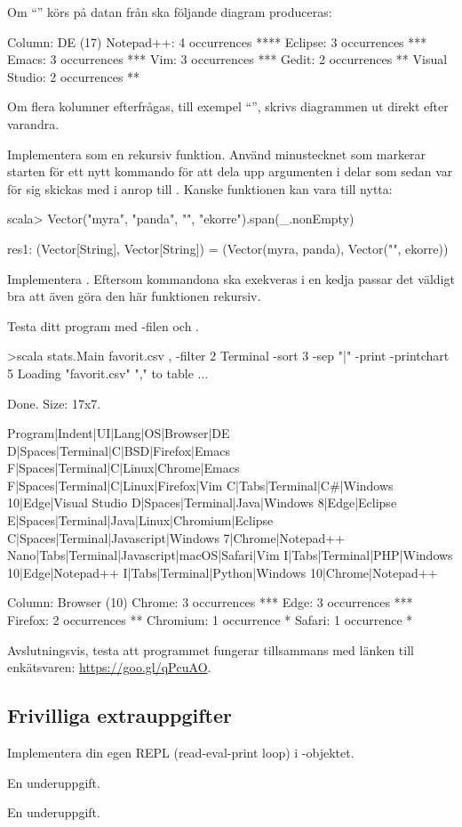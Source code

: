 Om ``'' körs på datan från  ska följande diagram produceras:
\begin{REPLnonum}
Column: DE (17)
Notepad++: 4 occurrences
****
Eclipse: 3 occurrences
***
Emacs: 3 occurrences
***
Vim: 3 occurrences
***
Gedit: 2 occurrences
**
Visual Studio: 2 occurrences
**

\end{REPLnonum}
Om flera kolumner efterfrågas, till exempel ``'', skrivs diagrammen ut direkt efter varandra.

\Subtask Implementera  som en rekursiv funktion. Använd minustecknet som markerar starten för ett nytt kommando för att dela upp argumenten  i delar som sedan var för sig skickas med i anrop till . Kanske funktionen  kan vara till nytta:
\begin{REPLnonum}
scala> Vector("myra", "panda", "", "ekorre").span(_.nonEmpty)

res1: (Vector[String], Vector[String]) = (Vector(myra, panda),
                                         Vector("", ekorre))
\end{REPLnonum}

\Subtask Implementera . Eftersom kommandona ska exekveras i en kedja passar det väldigt bra att även göra den här funktionen rekursiv.

\Subtask Testa ditt program med -filen och .
\begin{REPLnonum}
>scala stats.Main favorit.csv , -filter 2 Terminal -sort 3 -sep "|" -print
-printchart 5
Loading "favorit.csv" "," to table ...

Done. Size: 17x7.

Program|Indent|UI|Lang|OS|Browser|DE
D|Spaces|Terminal|C|BSD|Firefox|Emacs
F|Spaces|Terminal|C|Linux|Chrome|Emacs
F|Spaces|Terminal|C|Linux|Firefox|Vim
C|Tabs|Terminal|C#|Windows 10|Edge|Visual Studio
D|Spaces|Terminal|Java|Windows 8|Edge|Eclipse
E|Spaces|Terminal|Java|Linux|Chromium|Eclipse
C|Spaces|Terminal|Javascript|Windows 7|Chrome|Notepad++
Nano|Tabs|Terminal|Javascript|macOS|Safari|Vim
I|Tabs|Terminal|PHP|Windows 10|Edge|Notepad++
I|Tabs|Terminal|Python|Windows 10|Chrome|Notepad++

Column: Browser (10)
Chrome: 3 occurrences
***
Edge: 3 occurrences
***
Firefox: 2 occurrences
**
Chromium: 1 occurrence
*
Safari: 1 occurrence
*

\end{REPLnonum}

\Task Avslutningsvis, testa att programmet fungerar tillsammans med länken till enkätsvaren: \url{https://goo.gl/qPcuAO}.

\subsection{Frivilliga extrauppgifter}


\Task Implementera din egen REPL (read-eval-print loop) i -objektet.

\Subtask En underuppgift.

\Subtask En underuppgift.